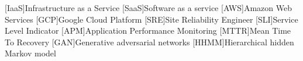 [IaaS]{Infrastructure as a Service}
[SaaS]{Software as a service}
[AWS]{Amazon Web Services}
[GCP]{Google Cloud Platform}
[SRE]{Site Reliability Engineer}
[SLI]{Service Level Indicator}
[APM]{Application Performance Monitoring}
[MTTR]{Mean Time To Recovery}
[GAN]{Generative adversarial networks}
[HHMM]{Hierarchical hidden Markov model}
